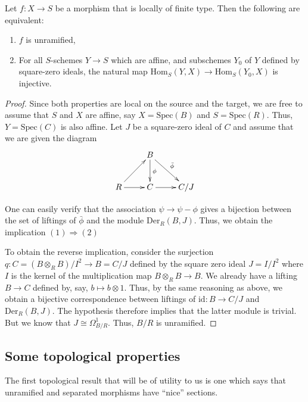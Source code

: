 \begin{theorem}
\label{theorem-formally-unramified}
Let $f:X \to S$ be a morphism that is locally of finite type. Then the
following are equivalent:
\begin{enumerate}
\item $f$ is unramified,
\item For all $S$-schemes $Y \to S$ which are affine, and subschemes $Y_0$ of
$Y$ defined by square-zero ideals, the natural map
$\text{Hom}_S(Y,X) \to \text{Hom}_S(Y_0,X)$ is injective.
\end{enumerate}
\end{theorem}

\begin{proof}
Since both properties are local on the source and the target, we are free to
assume that $S$ and $X$ are affine, say $X = \text{Spec}(B)$ and $S = \text{Spec}(R)$.
Thus, $Y = \text{Spec}(C)$ is also affine. Let $J$ be a square-zero ideal of $C$ and
assume that we are given the diagram
$$
\xymatrix{
					& B \ar[d]^\phi \ar[rd]^{\bar{\phi}}	& \\
R \ar[r] \ar[ur]	& C \ar[r]								& C/J
}
$$

\smallskip\noindent
One can easily verify that the association $\psi \to \psi - \phi$ gives a
bijection between the set of liftings of $\bar{\phi}$ and the module
$\text{Der}_R(B,J)$. Thus, we obtain the implication $(1) \Rightarrow (2)$

\smallskip\noindent
To obtain the reverse implication, consider the surjection
$q:C = (B \otimes_R B)/I^2 \to B = C/J$ defined by the square zero ideal
$J = I/I^2$ where $I$ is the kernel of the multiplication map
$B \otimes_R B \to B$. We already have a lifting $B \to C$ defined by, say,
$b \mapsto b \otimes 1$. Thus, by the same reasoning as above, we obtain a
bijective correspondence between liftings of $\mathrm{id}:B \to C/J$ and
$\text{Der}_R(B,J)$. The hypothesis therefore implies that the latter module is
trivial. But we know that $J \cong \Omega^1_{B/R}$. Thus, $B/R$ is unramified.
\end{proof}

\subsection{Some topological properties}
\label{subsection-topological-unramified}

\noindent
The first topological result that will be of utility to us is one which says
that unramified and separated morphisms have ``nice'' sections.

